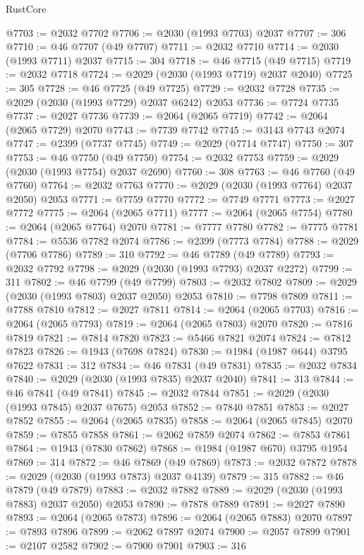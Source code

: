 \begin{lexlean}{RustCore}
\begin{coremodule}
@7703 := @2032 @7702
@7706 := @2030 (@1993 @7703) @2037
@7707 := 306
@7710 := @46 @7707 (@49 @7707)
@7711 := @2032 @7710
@7714 := @2030 (@1993 @7711) @2037
@7715 := 304
@7718 := @46 @7715 (@49 @7715)
@7719 := @2032 @7718
@7724 := @2029 (@2030 (@1993 @7719) @2037 @2040)
@7725 := 305
@7728 := @46 @7725 (@49 @7725)
@7729 := @2032 @7728
@7735 := @2029 (@2030 (@1993 @7729) @2037 @6242) @2053
@7736 := @7724 @7735
@7737 := @2027 @7736
@7739 := @2064 (@2065 @7719)
@7742 := @2064 (@2065 @7729) @2070
@7743 := @7739 @7742
@7745 := @3143 @7743 @2074
@7747 := @2399 (@7737 @7745)
@7749 := @2029 (@7714 @7747)
@7750 := 307
@7753 := @46 @7750 (@49 @7750)
@7754 := @2032 @7753
@7759 := @2029 (@2030 (@1993 @7754) @2037 @2690)
@7760 := 308
@7763 := @46 @7760 (@49 @7760)
@7764 := @2032 @7763
@7770 := @2029 (@2030 (@1993 @7764) @2037 @2050) @2053
@7771 := @7759 @7770
@7772 := @7749 @7771
@7773 := @2027 @7772
@7775 := @2064 (@2065 @7711)
@7777 := @2064 (@2065 @7754)
@7780 := @2064 (@2065 @7764) @2070
@7781 := @7777 @7780
@7782 := @7775 @7781
@7784 := @5536 @7782 @2074
@7786 := @2399 (@7773 @7784)
@7788 := @2029 (@7706 @7786)
@7789 := 310
@7792 := @46 @7789 (@49 @7789)
@7793 := @2032 @7792
@7798 := @2029 (@2030 (@1993 @7793) @2037 @2272)
@7799 := 311
@7802 := @46 @7799 (@49 @7799)
@7803 := @2032 @7802
@7809 := @2029 (@2030 (@1993 @7803) @2037 @2050) @2053
@7810 := @7798 @7809
@7811 := @7788 @7810
@7812 := @2027 @7811
@7814 := @2064 (@2065 @7703)
@7816 := @2064 (@2065 @7793)
@7819 := @2064 (@2065 @7803) @2070
@7820 := @7816 @7819
@7821 := @7814 @7820
@7823 := @5466 @7821 @2074
@7824 := @7812 @7823
@7826 := @1943 (@7698 @7824)
@7830 := @1984 (@1987 @644) @3795 @7622
@7831 := 312
@7834 := @46 @7831 (@49 @7831)
@7835 := @2032 @7834
@7840 := @2029 (@2030 (@1993 @7835) @2037 @2040)
@7841 := 313
@7844 := @46 @7841 (@49 @7841)
@7845 := @2032 @7844
@7851 := @2029 (@2030 (@1993 @7845) @2037 @7675) @2053
@7852 := @7840 @7851
@7853 := @2027 @7852
@7855 := @2064 (@2065 @7835)
@7858 := @2064 (@2065 @7845) @2070
@7859 := @7855 @7858
@7861 := @2062 @7859 @2074
@7862 := @7853 @7861
@7864 := @1943 (@7830 @7862)
@7868 := @1984 (@1987 @670) @3795 @1954
@7869 := 314
@7872 := @46 @7869 (@49 @7869)
@7873 := @2032 @7872
@7878 := @2029 (@2030 (@1993 @7873) @2037 @4139)
@7879 := 315
@7882 := @46 @7879 (@49 @7879)
@7883 := @2032 @7882
@7889 := @2029 (@2030 (@1993 @7883) @2037 @2050) @2053
@7890 := @7878 @7889
@7891 := @2027 @7890
@7893 := @2064 (@2065 @7873)
@7896 := @2064 (@2065 @7883) @2070
@7897 := @7893 @7896
@7899 := @2062 @7897 @2074
@7900 := @2057 @7899
@7901 := @2107 @2582
@7902 := @7900 @7901
@7903 := 316

\end{coremodule}
\end{lexlean}
